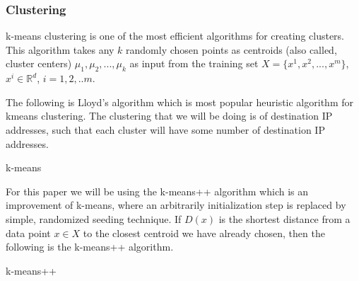 \documentclass[12pt,oneside,a4paper]{article}
\begin{document}
\subsubsection{Clustering} \label{subsec:Clustering}

k-means\cite{k-means-clustering} clustering is one of the most efficient algorithms for creating clusters. This algorithm takes any $k$ randomly chosen points as centroids (also called, cluster centers) $\mu_{1}, \mu_{2}, ..., \mu_{k}$ as input from the training set $X = \{x^{1}, x^{2}, ..., x^{m}\}$, $x^{i} \in \mathbb{R}^d$, $i= {1,2, ..m}$.

The following is Lloyd's algorithm which is most popular heuristic algorithm for kmeans clustering. The clustering that we will be doing is of destination IP addresses, such that each cluster will have some number of destination IP addresses.

\begin{algorithm}[H]
\caption{k-means}\label{k-means}
\begin{algorithmic}[1]
  \Repeat
\end{algorithmic}
\end{algorithm}

For this paper we will be using the k-means++ algorithm\cite{k-means++} which is an improvement of k-means, where an arbitrarily initialization step is replaced by simple, randomized seeding technique. If $D(x)$ is the shortest distance from a data point $x \in X$ to the closest centroid we have already chosen, then the following is the k-means++ algorithm.

\begin{algorithm}[H]
\caption{k-means++}\label{k-means++}
\begin{algorithmic}[1]
\end{algorithmic}
\end{algorithm}
\end{document}

